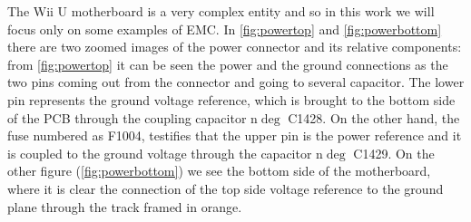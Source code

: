\documentclass[11pt,a4paper,titlepage]{article}
\begin{document}
      The Wii U motherboard is a very complex entity and so in this work we will focus only on some examples of EMC. In \autoref{fig:powertop} and \autoref{fig:powerbottom} there are two zoomed images of the power connector and its relative components: from \autoref{fig:powertop} it can be seen the power and the ground connections as the two pins coming out from the connector and going to several capacitor. The lower pin represents the ground voltage reference, which is brought to the bottom side of the PCB through the coupling capacitor n$\deg$ C1428. On the other hand, the fuse numbered as F1004, testifies that the upper pin is the power reference and it is coupled to the ground voltage through the capacitor n$\deg$ C1429. On the other figure (\autoref{fig:powerbottom}) we see the bottom side of the motherboard, where it is clear the connection of the top side voltage reference to the ground plane through the track framed in orange.
\end{document}
